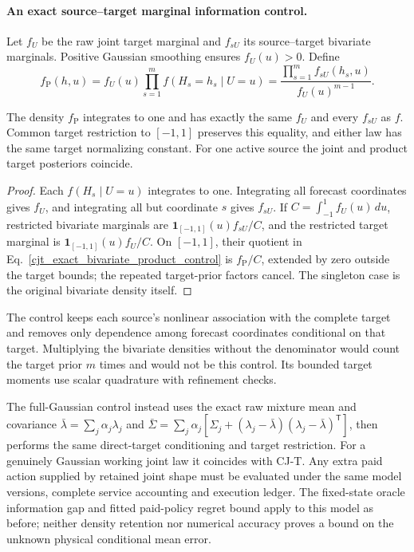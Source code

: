 \paragraph{An exact source--target marginal information control.}
Let $f_U$ be the raw joint target marginal and $f_{sU}$ its source--target
bivariate marginals.  Positive Gaussian smoothing ensures $f_U(u)>0$.
Define
\begin{equation}
 f_{\mathrm P}(h,u)=f_U(u)\prod_{s=1}^m f(H_s=h_s\mid U=u)
 =\frac{\prod_{s=1}^m f_{sU}(h_s,u)}{f_U(u)^{m-1}}.
 \label{cjt_exact_bivariate_product_control}
\end{equation}
\begin{proposition}
\label{cjt_product_preserves_bivariate_information}
The density $f_{\mathrm P}$ integrates to one and has exactly the same $f_U$
and every $f_{sU}$ as $f$.  Common target restriction to $[-1,1]$ preserves
this equality, and either law has the same target normalizing constant.
For one active source the joint and product target posteriors coincide.
\end{proposition}
\begin{proof}
Each $f(H_s\mid U=u)$ integrates to one.  Integrating all forecast coordinates
gives $f_U$, and integrating all but coordinate $s$ gives $f_{sU}$.
If $C=\int_{-1}^{1}f_U(u)\,du$, restricted bivariate marginals are
$\mathbf1_{[-1,1]}(u)f_{sU}/C$, and the restricted target marginal is
$\mathbf1_{[-1,1]}(u)f_U/C$.  On $[-1,1]$, their quotient in
Eq.~\eqref{cjt_exact_bivariate_product_control} is
$f_{\mathrm P}/C$, extended by zero outside the target bounds;
the repeated target-prior factors cancel.
The singleton case is the original bivariate density itself.
\end{proof}
The control keeps each source's nonlinear association with the complete target
and removes only dependence among forecast coordinates conditional on that
target.  Multiplying the bivariate densities without the denominator would
count the target prior $m$ times and would not be this control.
Its bounded target moments use scalar quadrature with refinement checks.

The full-Gaussian control instead uses the exact raw mixture mean and covariance
$\bar\lambda=\sum_j\alpha_j\lambda_j$ and
$\bar\Sigma=\sum_j\alpha_j[\Sigma_j+
(\lambda_j-\bar\lambda)(\lambda_j-\bar\lambda)^{\mathsf T}]$,
then performs the same direct-target conditioning and target restriction.
For a genuinely Gaussian working joint law it coincides with CJ-T.
Any extra paid action supplied by retained joint shape must be evaluated under
the same model versions, complete service accounting and execution ledger.
The fixed-state oracle information gap and fitted paid-policy regret bound
apply to this model as before; neither density retention nor numerical accuracy
proves a bound on the unknown physical conditional mean error.

